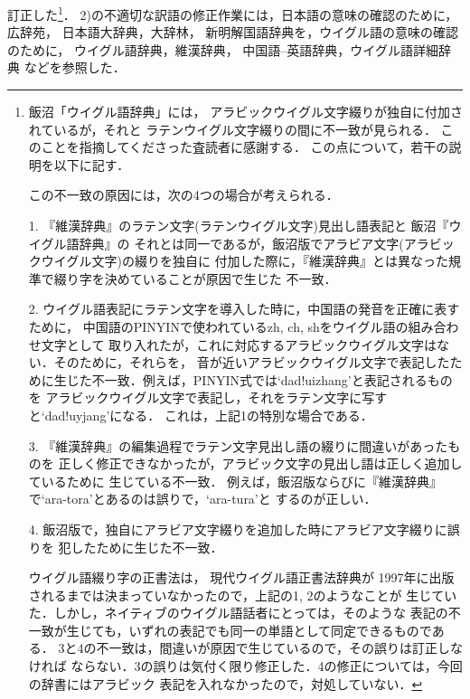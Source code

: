 訂正した\footnote{飯沼「ウイグル語辞典」には，
アラビックウイグル文字綴りが独自に付加されているが，それと
ラテンウイグル文字綴りの間に不一致が見られる．
このことを指摘してくださった査読者に感謝する．
この点について，若干の説明を以下に記す．

この不一致の原因には，次の4つの場合が考えられる．

1. 『維漢辞典』のラテン文字(ラテンウイグル文字)見出し語表記と
飯沼『ウイグル語辞典』の
それとは同一であるが，飯沼版でアラビア文字(アラビックウイグル文字)の綴りを独自に
付加した際に，『維漢辞典』とは異なった規準で綴り字を決めていることが原因で生じた
不一致．

2. ウイグル語表記にラテン文字を導入した時に，中国語の発音を正確に表すために，
中国語のPINYINで使われているzh, ch, shをウイグル語の組み合わせ文字として
取り入れたが，これに対応するアラビックウイグル文字はない．そのために，それらを，
音が近いアラビックウイグル文字で表記したために生じた不一致．例えば，PINYIN式では`dad!uizhang'と表記されるものを
アラビックウイグル文字で表記し，それをラテン文字に写すと`dad!uyjang'になる．
これは，上記1の特別な場合である．

3. 『維漢辞典』の編集過程でラテン文字見出し語の綴りに間違いがあったものを
正しく修正できなかったが，アラビック文字の見出し語は正しく追加しているために
生じている不一致．
例えば，飯沼版ならびに『維漢辞典』で`ara-tora'とあるのは誤りで，`ara-tura'と
するのが正しい．

4. 飯沼版で，独自にアラビア文字綴りを追加した時にアラビア文字綴りに誤りを
犯したために生じた不一致．

ウイグル語綴り字の正書法は，
現代ウイグル語正書法辞典\cite{UIIMLA}が
1997年に出版されるまでは決まっていなかったので，上記の1, 2のようなことが
生じていた．しかし，ネイティブのウイグル語話者にとっては，そのような
表記の不一致が生じても，いずれの表記でも同一の単語として同定できるものである．
3と4の不一致は，間違いが原因で生じているので，その誤りは訂正しなければ
ならない．3の誤りは気付く限り修正した．4の修正については，今回の辞書にはアラビック
表記を入れなかったので，対処していない．
}．
2)の不適切な訳語の修正作業には，日本語の意味の確認のために，広辞苑\cite{KOJIEN}，
日本語大辞典\cite{KODANSHA}，大辞林\cite{SANSEIDO}，
新明解国語辞典\cite{BOOKSHELF}を，ウイグル語の意味の確認のために，
ウイグル語辞典\cite{UJDIC}，維漢辞典\cite{UHDIC}，
中国語--英語辞典\cite{EC_CE_DIC}，ウイグル語詳細辞典\cite{UILUGET}
などを参照した．

